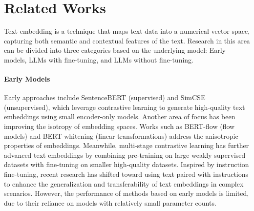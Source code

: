 \section{Related Works}
Text embedding is a technique that maps text data into a numerical vector space, capturing both semantic and contextual features of the text. Research in this area can be divided into three categories based on the underlying model: Early models, LLMs with fine-tuning, and LLMs without fine-tuning.

\paragraph{Early Models} Early approaches
include SentenceBERT \cite{DBLP:conf/emnlp/ReimersG19} (supervised) and SimCSE \cite{DBLP:conf/emnlp/GaoYC21} (unsupervised), which leverage contrastive learning to generate high-quality text embeddings using small encoder-only models. Another area of focus has been improving the isotropy of embedding spaces. Works such as BERT-flow \cite{DBLP:conf/emnlp/LiZHWYL20} (flow models) and BERT-whitening \cite{DBLP:journals/corr/abs-2103-15316} (linear transformations) address the anisotropic properties of embeddings. Meanwhile, multi-stage contrastive learning \cite{DBLP:journals/corr/abs-2308-03281, DBLP:conf/emnlp/Ni0LDAMZLHCY22, DBLP:journals/corr/abs-2212-03533} has further advanced text embeddings by combining pre-training on large weakly supervised datasets with fine-tuning on smaller high-quality datasets. Inspired by instruction fine-tuning, recent research \cite{DBLP:conf/acl/SuSKWHOYSZ023, DBLP:conf/acl/AsaiSL0I0HY23} has shifted toward using text paired with instructions to enhance the generalization and transferability of text embeddings in complex scenarios. However, the performance of methods based on early models is limited, due to their reliance on models with relatively small parameter counts.


